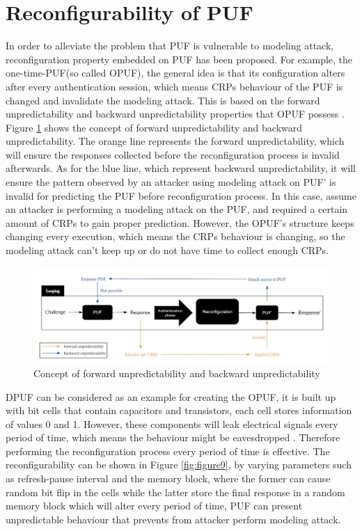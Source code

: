 \section{Reconfigurability of PUF}
In order to alleviate the problem that PUF is vulnerable to modeling attack, reconfiguration property embedded on PUF has been proposed. For example, the one-time-PUF(so called 
OPUF), the general idea is that its configuration alters after every authentication session, which means CRPs behaviour of the PUF is changed and invalidate the modeling attack. This is based on the
forward unpredictability and backward unpredictability properties that OPUF possess \cite{Reference7}. Figure \ref{fig:figure8} shows the concept of forward unpredictability and backward unpredictability.
The orange line represents the forward unpredictability, which will ensure the responses collected before the reconfiguration process is invalid afterwards. As for the blue line, 
which represent backward unpredictability, it will ensure the pattern observed by an attacker using modeling attack on PUF' is invalid for predicting the PUF before reconfiguration process. 
In this case, assume an attacker is performing a modeling attack on the PUF, and required a certain amount of CRPs to gain proper prediction. However, the OPUF's structure keeps changing every execution, which means the CRPs 
behaviour is changing, so the modeling attack can't keep up or do not have time to collect enough CRPs.
\begin{figure}[htp]
    \centering
    \includegraphics[width=18cm]{figures/figure8.jpg}
    \caption{Concept of forward unpredictability and backward unpredictability}
    \label{fig:figure8}
    \end{figure}

DPUF can be considered as an example for creating the OPUF, it is built up with bit cells that contain capacitors and transistors, each cell stores information of values 0 and 1. However, these components will leak 
electrical signals every period of time, which means the behaviour might be eavesdropped \cite{Reference7}. Therefore performing the reconfiguration process every period of time is effective. The reconfigurability can be shown in Figure \ref{fig:figure9}, by varying parameters
such as refresh-pause interval and the memory block, where the former can cause random bit flip in the cells while the latter store the final response in a random memory block 
which will alter every period of time, PUF can present unpredictable behaviour that prevents from attacker perform modeling attack.


